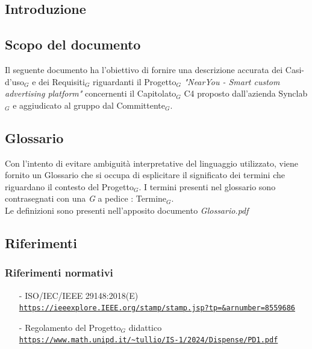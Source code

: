 \documentclass[11pt]{article}
\begin{document}
\newpage
\begin{justify}

\section{Introduzione}
\label{sec:intro}

\subsection{Scopo del documento}

Il seguente documento ha l'obiettivo di fornire una descrizione accurata dei Casi-d'uso$_G$ e dei Requisiti$_G$ riguardanti il Progetto$_G$ \textit{"NearYou - 
Smart custom advertising platform"} concernenti il Capitolato$_G$ C4 proposto dall'azienda Synclab$_G$ e aggiudicato al gruppo dal Committente$_G$.


\subsection{Glossario}
Con l'intento di evitare ambiguità interpretative del linguaggio utilizzato, viene fornito un Glossario che si occupa di esplicitare il significato dei termini che riguardano il contesto del Progetto$_G$. I termini presenti nel glossario sono contrasegnati con una \textit{G} a pedice : Termine$_G$.\\
Le definizioni sono presenti nell'apposito documento \textit{Glossario.pdf}


\subsection{Riferimenti}

\subsubsection{Riferimenti normativi}
\begin{itemize}
    \item[-] ISO/IEC/IEEE 29148:2018(E) \\
    \textcolor{blue}{\texttt{\url{https://ieeexplore.IEEE.org/stamp/stamp.jsp?tp=&arnumber=8559686}}}
    
    \item[-] Regolamento del Progetto$_G$ didattico  \\
    \textcolor{blue}{\texttt{\url{https://www.math.unipd.it/~tullio/IS-1/2024/Dispense/PD1.pdf}}}
    

\end{itemize}
\end{justify}
\end{document}

